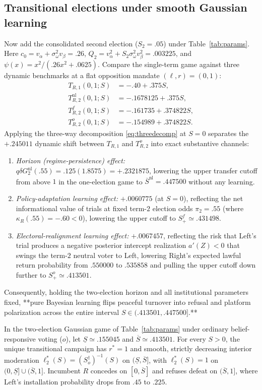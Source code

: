 \subsection{Transitional elections under smooth Gaussian learning}

Now add the consolidated second election ($S_2=.05$) under Table~\ref{tab:params}. Here $c_0=v_\alpha+\sigma_\omega^2 v_\beta=.26$, $Q_2=v_\alpha^2+S_2\sigma_\omega^2 v_\beta^2=.003225$, and $\psi(x)=x^2/(.26x^2+.0625)$. Compare the single-term game against three dynamic benchmarks at a flat opposition mandate $(\ell,r)=(0,1)$:
\begin{align}
 T_{R,1}(0,1;S) &= -.40+.375S,\nonumber\\
 T_{R,2}^{\mathrm{nl}}(0,1;S) &= -.1678125+.375S,\nonumber\\
 T_{R,2}^{f}(0,1;S) &= -.161735+.374822S,\nonumber\\
 T_{R,2}^{o}(0,1;S) &= -.154989+.374822S.
 \label{eq:flatcompare}
\end{align}
Applying the three-way decomposition \eqref{eq:threedecomp} at $S=0$ separates the $+.245011$ dynamic shift between $T_{R,1}$ and $T_{R,2}^o$ into exact substantive channels:
\begin{enumerate}
\item \emph{Horizon (regime-persistence) effect:} $q\delta G_2^{\mathrm{nl}}(.55)=.125(1.8575)=+.2321875$, lowering the upper transfer cutoff from above $1$ in the one-election game to $\overline S^{\mathrm{nl}}=.447500$ without any learning.
\item \emph{Policy-adaptation learning effect:} $+.0060775$ (at $S=0$), reflecting the net informational value of trials at fixed term-$2$ election odds $\pi_2=.55$ (where $\kappa_R(.55)=-.60<0$), lowering the upper cutoff to $S_+^f\simeq .431498$.
\item \emph{Electoral-realignment learning effect:} $+.0067457$, reflecting the risk that Left's trial produces a negative posterior intercept realization $a'(Z)<0$ that swings the term-$2$ neutral voter to Left, lowering Right's expected lawful return probability from $.550000$ to $.535858$ and pulling the upper cutoff down further to $S_+^o\simeq .413501$.
\end{enumerate}
Consequently, holding the two-election horizon and all institutional parameters fixed, **pure Bayesian learning flips peaceful turnover into refusal and platform polarization across the entire interval $S\in(.413501,.447500]$.**

\begin{result}\label{prop:two}
In the two-election Gaussian game of Table~\ref{tab:params} under ordinary belief-responsive voting ($o$), let $\underline S\simeq .155045$ and $\overline S\simeq .413501$. For every $S>0$, the unique transitional campaign has $r^*=1$ and smooth, strictly decreasing interior moderation $\ell_2^*(S)=(S_o^\dagger)^{-1}(S)$ on $(\underline S,\overline S]$, with $\ell_2^*(S)=1$ on $(0,\underline S]\cup(\overline S,1]$. Incumbent $R$ concedes on $[0,\overline S]$ and refuses defeat on $(\overline S,1]$, where Left's installation probability drops from $.45$ to $.225$.
\end{result}

